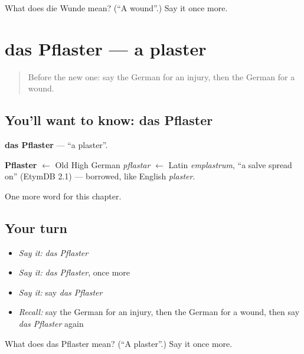 \begin{tcolorbox}[breakable,colback=teal!4,colframe=teal!35!black,title={Before you move on}]
What does die Wunde mean? (\textquotedblleft{}A wound\textquotedblright{}.) Say it once more.
\end{tcolorbox}
\section[das Pflaster]{das Pflaster — a plaster}

\label{lesson:GE-C206-pflaster}



\begin{quote}
Before the new one: say the German for an injury, then the German for a wound.
\end{quote}

\subsection*{You'll want to know: das Pflaster}
\textbf{das Pflaster} — \textquotedblleft{}a plaster\textquotedblright{}.

\begin{cousinweb}
\textbf{Pflaster} $\leftarrow$ Old High German \emph{pflastar} $\leftarrow$ Latin \emph{emplastrum}, \textquotedblleft{}a salve spread on\textquotedblright{} (EtymDB 2.1) — borrowed, like English \emph{plaster}.
\end{cousinweb}

\begin{grammarlens}[title={What you've built}]
One more word for this chapter.
\end{grammarlens}

\subsection*{Your turn}
\begin{itemize}
\raggedright
  \item \emph{Say it:} \emph{das Pflaster}
  \item \emph{Say it:} \emph{das Pflaster}, once more
  \item \emph{Say it:} say \emph{das Pflaster}
  \item \emph{Recall:} say the German for an injury, then the German for a wound, then say \emph{das Pflaster} again
\end{itemize}

\begin{tcolorbox}[breakable,colback=teal!4,colframe=teal!35!black,title={Before you move on}]
What does das Pflaster mean? (\textquotedblleft{}A plaster\textquotedblright{}.) Say it once more.
\end{tcolorbox}
